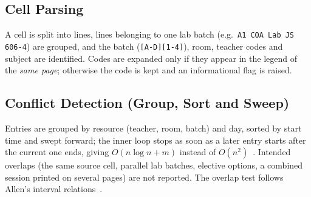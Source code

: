 \subsection{Cell Parsing}
A cell is split into lines, lines belonging to one lab batch (e.g.\ \texttt{A1 COA Lab JS 606-4}) are
grouped, and the batch (\texttt{[A-D][1-4]}), room, teacher codes and subject are identified. Codes are
expanded only if they appear in the legend of the \emph{same page}; otherwise the code is kept and an
informational flag is raised.

\subsection{Conflict Detection (Group, Sort and Sweep)}
Entries are grouped by resource (teacher, room, batch) and day, sorted by start time and swept forward;
the inner loop stops as soon as a later entry starts after the current one ends, giving
$O(n\log n + m)$ instead of $O(n^2)$~\cite{cormen2009}. Intended overlaps (the same source cell,
parallel lab batches, elective options, a combined session printed on several pages) are not
reported. The overlap test follows Allen's interval relations~\cite{allen1983}.


